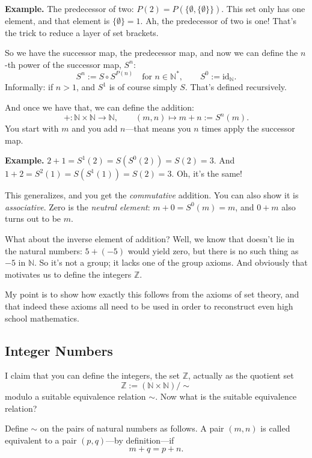\textbf{Example.} The predecessor of two: $P(2) = P(\{\emptyset, \{\emptyset\}\})$. This set only has one element, and that element is $\{\emptyset\} = 1$. Ah, the predecessor of two is one! That's the trick to reduce a layer of set brackets.

So we have the successor map, the predecessor map, and now we can define the $n$-th power of the successor map, $S^n$:
\[
S^n := S \circ S^{P(n)} \quad \text{for } n \in \mathbb{N}^*, \qquad S^0 := \mathrm{id}_{\mathbb{N}}.
\]
Informally: if $n > 1$, and $S^1$ is of course simply $S$. That's defined recursively.

And once we have that, we can define the addition:
\[
+ : \mathbb{N} \times \mathbb{N} \to \mathbb{N}, \qquad (m, n) \mapsto m + n := S^n(m).
\]
You start with $m$ and you add $n$---that means you $n$ times apply the successor map.

\textbf{Example.} $2 + 1 = S^1(2) = S(S^0(2)) = S(2) = 3$. And $1 + 2 = S^2(1) = S(S^1(1)) = S(2) = 3$. Oh, it's the same!

This generalizes, and you get the \emph{commutative} addition. You can also show it is \emph{associative}. Zero is the \emph{neutral element}: $m + 0 = S^0(m) = m$, and $0 + m$ also turns out to be $m$.

What about the inverse element of addition? Well, we know that doesn't lie in the natural numbers: $5 + (-5)$ would yield zero, but there is no such thing as $-5$ in $\mathbb{N}$. So it's not a group; it lacks one of the group axioms. And obviously that motivates us to define the integers $\mathbb{Z}$.

My point is to show how exactly this follows from the axioms of set theory, and that indeed these axioms all need to be used in order to reconstruct even high school mathematics.

\subsection*{Integer Numbers}

I claim that you can define the integers, the set $\mathbb{Z}$, actually as the quotient set
\[
\mathbb{Z} := (\mathbb{N} \times \mathbb{N}) / {\sim}
\]
modulo a suitable equivalence relation $\sim$. Now what is the suitable equivalence relation?

Define $\sim$ on the pairs of natural numbers as follows. A pair $(m, n)$ is called equivalent to a pair $(p, q)$---by definition---if
\[
m + q = p + n.
\]

